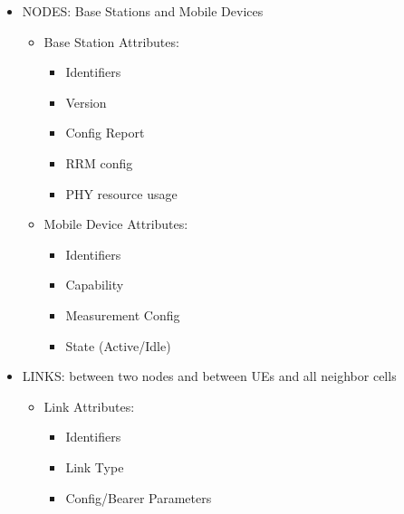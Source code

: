 \documentclass[a4paper,11pt,english]{sphinxmanual}
\begin{document}
\begin{itemize}
\item {} 
\sphinxAtStartPar
NODES: Base Stations and Mobile Devices
\begin{itemize}
\item {} 
\sphinxAtStartPar
Base Station Attributes:
\begin{itemize}
\item {} 
\sphinxAtStartPar
Identifiers

\item {} 
\sphinxAtStartPar
Version

\item {} 
\sphinxAtStartPar
Config Report

\item {} 
\sphinxAtStartPar
RRM config

\item {} 
\sphinxAtStartPar
PHY resource usage

\end{itemize}

\item {} 
\sphinxAtStartPar
Mobile Device Attributes:
\begin{itemize}
\item {} 
\sphinxAtStartPar
Identifiers

\item {} 
\sphinxAtStartPar
Capability

\item {} 
\sphinxAtStartPar
Measurement Config

\item {} 
\sphinxAtStartPar
State (Active/Idle)

\end{itemize}

\end{itemize}

\item {} 
\sphinxAtStartPar
LINKS:  between two nodes and  between UEs and all
neighbor cells
\begin{itemize}
\item {} 
\sphinxAtStartPar
Link Attributes:
\begin{itemize}
\item {} 
\sphinxAtStartPar
Identifiers

\item {} 
\sphinxAtStartPar
Link Type

\item {} 
\sphinxAtStartPar
Config/Bearer Parameters


\end{itemize}
\end{itemize}
\end{itemize}
\end{document}
